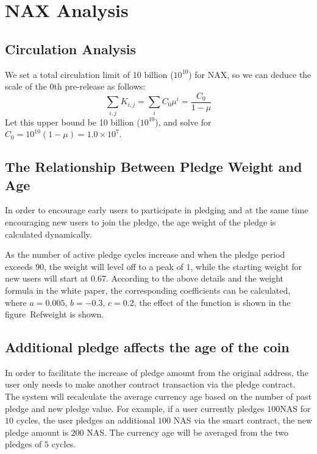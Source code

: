 \section{NAX Analysis}
\subsection{Circulation Analysis}
We set a total circulation limit of 10 billion (\(10^{10}\)) for NAX, so we can deduce the scale of the 0th pre-release as follows:
\begin{equation}
  \sum_{i,j} K_{i,j} = \sum_i C_0 \mu^i = \frac{C_0}{1-\mu}
\end{equation}
  Let this upper bound be 10 billion (\(10^{10}\)), and solve for \(C_0 = 10^{10}(1-\mu) = 1.0\times10^7\).

\subsection{The Relationship Between Pledge Weight and Age}
In order to encourage early users to participate in pledging and at the same time encouraging new users to join the pledge, the age weight of the pledge is calculated dynamically. 

As the number of active pledge cycles increase and when the pledge period exceeds $90$, the weight will level off to a peak of $1$, while the starting weight for new users will start at $0.67$. According to the above details and the weight formula in the white paper, the corresponding coefficients can be calculated, where \(a=0.005\), \(b=-0.3\), \(c=0.2\), the effect of the function is shown in the figure\ Ref{weight} is shown.

\subsection{Additional pledge affects the age of the coin}
In order to facilitate the increase of pledge amount from the original address, the user only needs to make another contract transaction via the pledge contract. The system will recalculate the average currency age based on the number of past pledge and new pledge value. For example, if a user currently pledges $100$NAS for $10$ cycles, the user pledges an additional $100$ NAS via the smart contract, the new pledge amount is $200$ NAS. The currency age will be averaged from the two pledges of $5$ cycles.
